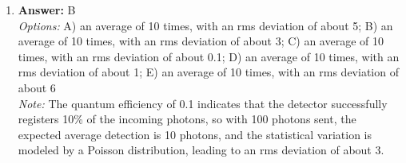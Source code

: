 \documentclass[12pt]{article}
\begin{document}
\begin{enumerate}[label=\arabic*.]
\item \textbf{Answer:} B
\\ \textit{Options:} A) an average of 10 times, with an rms deviation of about 5; B) an average of 10 times, with an rms deviation of about 3; C) an average of 10 times, with an rms deviation of about 0.1; D) an average of 10 times, with an rms deviation of about 1; E) an average of 10 times, with an rms deviation of about 6
\\ \textit{Note:} The quantum efficiency of 0.1 indicates that the detector successfully registers 10\% of the incoming photons, so with 100 photons sent, the expected average detection is 10 photons, and the statistical variation is modeled by a Poisson distribution, leading to an rms deviation of about 3.
\end{enumerate}
\end{document}
